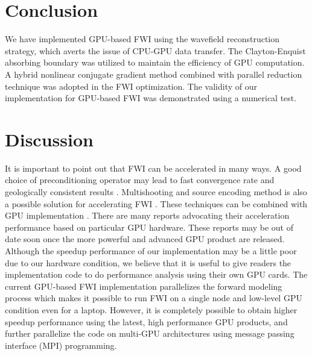 


\section{Conclusion}

We have implemented GPU-based FWI using the wavefield reconstruction strategy, which averts the issue of CPU-GPU data transfer. The Clayton-Enquist absorbing boundary was utilized to maintain the efficiency of GPU computation. A hybrid nonlinear conjugate gradient method combined with parallel reduction technique was adopted in the FWI optimization. The validity of our  implementation for GPU-based FWI was demonstrated using a numerical test. 

\section{Discussion}
It is important to point out that FWI can be accelerated in many ways. A good choice of preconditioning operator may lead to fast convergence rate and geologically consistent results \citep{virieux2009overview,ayeni2009joint,guitton2012constrained}. Multishooting and source encoding method is also a possible solution for accelerating FWI \citep{schiemenz2013accelerated,moghaddam2013new}. These techniques can be combined with GPU implementation \citep{wang2011cuda}. There are many reports advocating their acceleration performance based on particular GPU hardware. These reports may be out of date soon once the more powerful and advanced GPU product are released. Although the speedup performance of our implementation may be a little poor due to our hardware condition, we believe that it is useful to give readers the implementation code to do performance analysis using their own GPU cards. The current GPU-based FWI implementation parallelizes the forward modeling process which makes it possible to run FWI on a single node and low-level GPU condition even for a laptop. However, it  is completely possible to obtain higher speedup performance using the latest, high performance GPU products, and further parallelize the code on multi-GPU architectures using message passing interface (MPI) programming.


